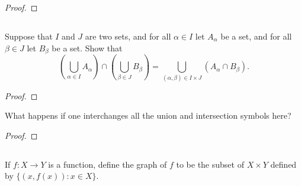 \documentclass[../../main.tex]{subfiles}
\begin{document}
\begin{proof}
    
\end{proof}
\begin{xx}
    
\end{xx}

\subsection{}
\begin{q}
    Suppose that $I$ and $J$ are two sets, and for all $\alpha \in I$ let $A_{\alpha}$ be a set, and for all $\beta \in J$ let $B_{\beta}$ be a set. Show that
        \[
        \left(\bigcup_{\alpha \in I} A_{\alpha}\right) \cap \left(\bigcup_{\beta \in J} B_{\beta}\right) = \bigcup_{(\alpha, \beta) \in I \times J} \left(A_{\alpha} \cap B_{\beta}\right).
        \]
\end{q}

\begin{proof}
    
\end{proof}
\begin{xx}
    
\end{xx}
        
\begin{q}
    What happens if one interchanges all the union and intersection symbols here?
\end{q}

\begin{ans}
    
\end{ans}
    
\begin{proof}
    
\end{proof}
\begin{xx}
    
\end{xx}

\subsection{}
\begin{q}
    If $f : X \to Y$ is a function, define the graph of $f$ to be the subset of $X \times Y$ defined by $\{(x, f(x)) : x \in X\}$.
\end{q}
\end{document}
